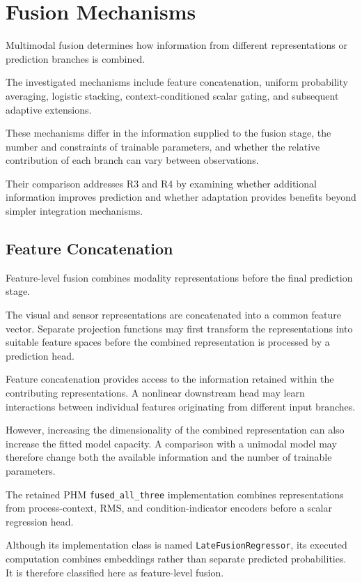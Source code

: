 \section{Fusion Mechanisms}

Multimodal fusion determines how information from different representations or prediction branches is combined.

The investigated mechanisms include feature concatenation, uniform probability averaging, logistic stacking, context-conditioned scalar gating, and subsequent adaptive extensions.

These mechanisms differ in the information supplied to the fusion stage, the number and constraints of trainable parameters, and whether the relative contribution of each branch can vary between observations.

Their comparison addresses R3 and R4 by examining whether additional information improves prediction and whether adaptation provides benefits beyond simpler integration mechanisms.

\subsection{Feature Concatenation}

Feature-level fusion combines modality representations before the final prediction stage.

The visual and sensor representations are concatenated into a common feature vector. Separate projection functions may first transform the representations into suitable feature spaces before the combined representation is processed by a prediction head.

Feature concatenation provides access to the information retained within the contributing representations. A nonlinear downstream head may learn interactions between individual features originating from different input branches.

However, increasing the dimensionality of the combined representation can also increase the fitted model capacity. A comparison with a unimodal model may therefore change both the available information and the number of trainable parameters.

The retained PHM \texttt{fused\_all\_three} implementation combines representations from process-context, RMS, and condition-indicator encoders before a scalar regression head.

Although its implementation class is named \texttt{LateFusionRegressor}, its executed computation combines embeddings rather than separate predicted probabilities. It is therefore classified here as feature-level fusion.

